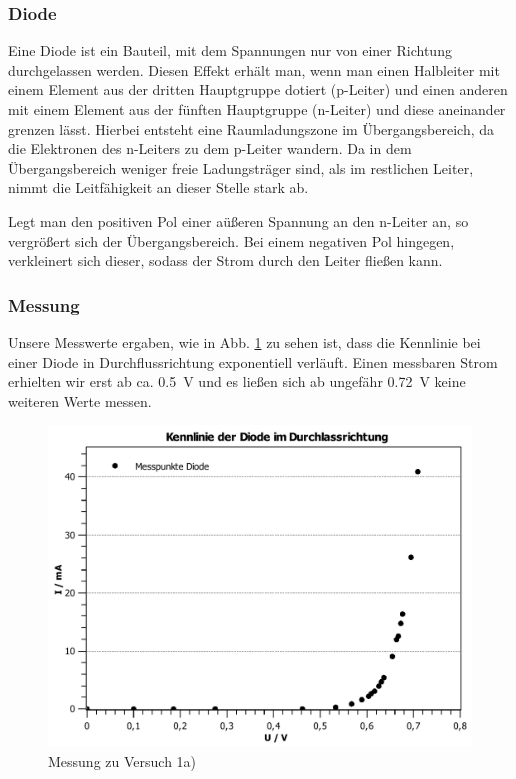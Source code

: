 \documentclass[11pt,a4paper,titlepage, ngerman]{article}
\begin{document}
			\subsubsection{Diode}
				\label{Diode}
				
				Eine Diode ist ein Bauteil, mit dem Spannungen nur von einer Richtung durchgelassen werden. Diesen Effekt erhält man, wenn man einen Halbleiter mit einem Element aus der dritten Hauptgruppe dotiert (p-Leiter) und einen anderen mit einem Element aus der fünften Hauptgruppe (n-Leiter) und diese aneinander grenzen lässt. Hierbei entsteht eine Raumladungszone im Übergangsbereich, da die Elektronen des n-Leiters zu dem p-Leiter wandern. Da in dem Übergangsbereich weniger freie Ladungsträger sind, als im restlichen Leiter, nimmt die Leitfähigkeit an dieser Stelle stark ab.
				
				Legt man den positiven Pol einer aüßeren Spannung an den n-Leiter an, so vergrößert sich der Übergangsbereich. Bei einem negativen Pol hingegen, verkleinert sich dieser, sodass der Strom durch den Leiter fließen kann. 
			
			\subsubsection{Messung}
				
				Unsere Messwerte ergaben, wie in Abb. \ref{KL a} zu sehen ist, dass die Kennlinie bei einer Diode in Durchflussrichtung exponentiell verläuft. Einen messbaren Strom erhielten wir erst ab ca. \SI{0.5}{\V} und es ließen sich ab ungefähr \SI{0.72}{\V} keine weiteren Werte messen. 
				
				\begin{figure}
					\centering
					\includegraphics[width=\textwidth]{KennlinieDiode.pdf}
					\caption{Messung zu Versuch 1a)}
					\label{KL a}
				\end{figure}
			
\end{document}
